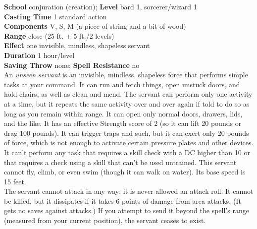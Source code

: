 \textbf{School} conjuration (creation); \textbf{Level} bard 1, sorcerer/wizard 1\\
\textbf{Casting Time} 1 standard action\\
\textbf{Components} V, S, M (a piece of string and a bit of wood)\\
\textbf{Range} close (25 ft. + 5 ft./2 levels)\\
\textbf{Effect} one invisible, mindless, shapeless servant\\
\textbf{Duration} 1 hour/level\\
\textbf{Saving Throw} none; \textbf{Spell Resistance} no\\
An \textit{unseen servant }is an invisible, mindless, shapeless force that performs simple tasks at your command. It can run and fetch things, open unstuck doors, and hold chairs, as well as clean and mend. The servant can perform only one activity at a time, but it repeats the same activity over and over again if told to do so as long as you remain within range. It can open only normal doors, drawers, lids, and the like. It has an effective Strength score of 2 (so it can lift 20 pounds or drag 100 pounds). It can trigger traps and such, but it can exert only 20 pounds of force, which is not enough to activate certain pressure plates and other devices. It can't perform any task that requires a skill check with a DC higher than 10 or that requires a check using a skill that can't be used untrained. This servant cannot fly, climb, or even swim (though it can walk on water). Its base speed is 15 feet.\\
The servant cannot attack in any way; it is never allowed an attack roll. It cannot be killed, but it dissipates if it takes 6 points of damage from area attacks. (It gets no saves against attacks.) If you attempt to send it beyond the spell's range (measured from your current position), the servant ceases to exist.\\

